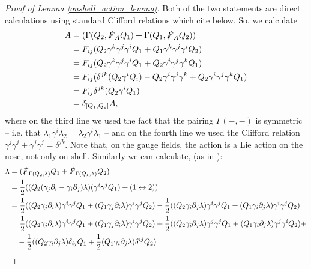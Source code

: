 \documentclass[10pt, oneside]{article}
\begin{document}
\begin{proof}[Proof of Lemma \ref{onshell_action_lemma}]
Both of the two statements are direct calculations using standard Clifford relations which cite below.
So, we calculate
\begin{align*}
[\delta_{Q_1}, \delta_{Q_2}] A &= (\Gamma(Q_2,\sd F_A Q_1) + \Gamma(Q_1,\sd F_A Q_2)) \\
&=  F_{ij}(Q_2 \gamma^k \gamma^j \gamma^i Q_1 + Q_1 \gamma^k \gamma^j \gamma^i Q_2) \\
&=  F_{ij}(Q_2 \gamma^k \gamma^j \gamma^i Q_1 + Q_2 \gamma^i \gamma^j \gamma^k Q_1)\\
&= F_{ij}(\delta^{jk}(Q_2\gamma^i Q_i) - Q_2 \gamma^i \gamma^j \gamma^k + Q_2 \gamma^i \gamma^j \gamma^k Q_1)\\
&=  F_{ij}\delta^{jk}(Q_2 \gamma^i Q_1) \\
&= \delta_{[Q_1, Q_2]} A,
\end{align*}
where on the third line we used the fact that the pairing $\Gamma(-,-)$ is symmetric -- i.e. that $\lambda_1 \gamma^i \lambda_2 = \lambda_2 \gamma^i \lambda_1$ -- and on the fourth line we used the Clifford relation $\gamma^j\gamma^j+\gamma^j\gamma^j = \delta^{jk}$.  Note that, on the gauge fields, the action is a Lie action on the nose, not only on-shell.  Similarly we can calculate, (as in \cite{Guillen}):
\begin{align*}
[\delta_{Q_1}, \delta_{Q_2}] \lambda &= (\sd F_{\Gamma(Q_2, \lambda)} Q_1 + \sd F_{\Gamma(Q_1,\lambda)} Q_2) \\
&= \frac 12((Q_2 (\gamma_j \dd_i - \gamma_i \dd_j) \lambda) (\gamma^i \gamma^j Q_1) + (1 \leftrightarrow 2)) \\
&= \frac 12((Q_2 \gamma_j \dd_i \lambda) \gamma^i \gamma^j Q_1 + (Q_1 \gamma_j \dd_i \lambda) \gamma^i \gamma^j Q_2) - \frac 12((Q_2 \gamma_i \dd_j \lambda) \gamma^i \gamma^j Q_1 + (Q_1 \gamma_i \dd_j \lambda) \gamma^i \gamma^j Q_2) \\
&= \frac 12((Q_2 \gamma_j \dd_i \lambda) \gamma^i \gamma^j Q_1 + (Q_1 \gamma_j \dd_i \lambda) \gamma^i \gamma^j Q_2) + \frac 12((Q_2 \gamma_i \dd_j \lambda) \gamma^j \gamma^j Q_1 + (Q_1 \gamma_i \dd_j \lambda) \gamma^j \gamma^i Q_2) + \\
&\quad - \frac 12((Q_2 \gamma_i \dd_j \lambda) \delta_{ij} Q_1 + \frac 12(Q_1 \gamma_i \dd_j \lambda) \delta^{ij} Q_2) \\

\end{align*}
\end{proof}
\end{document}
